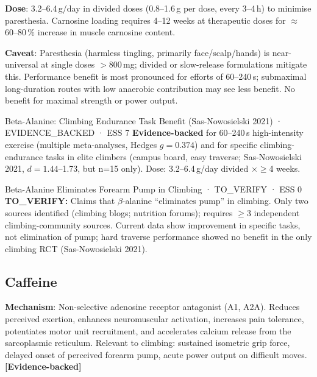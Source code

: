 \textbf{Dose}: 3.2--6.4\,g/day in divided doses (0.8--1.6\,g per dose, every 3--4\,h) to minimise paresthesia. Carnosine loading requires 4--12 weeks at therapeutic doses for ${\approx}$60--80\,\% increase in muscle carnosine content.

\textbf{Caveat}: Paresthesia (harmless tingling, primarily face/scalp/hands) is near-universal at single doses $>$800\,mg; divided or slow-release formulations mitigate this. Performance benefit is most pronounced for efforts of 60--240\,s; submaximal long-duration routes with low anaerobic contribution may see less benefit. No benefit for maximal strength or power output.

\begin{evidencebox}{Beta-Alanine: Climbing Endurance Task Benefit (Sas-Nowosielski 2021) · EVIDENCE\_BACKED · ESS 7}
\textbf{Evidence-backed} for 60--240\,s high-intensity exercise (multiple meta-analyses, Hedges $g = 0.374$) and for specific climbing-endurance tasks in elite climbers (campus board, easy traverse; Sas-Nowosielski 2021, $d = 1.44$--1.73, but n=15 only). Dose: 3.2--6.4\,g/day divided $\times \geq$4 weeks.
\end{evidencebox}

\begin{toverifybox}{Beta-Alanine Eliminates Forearm Pump in Climbing · TO\_VERIFY · ESS 0}
\textbf{TO\_VERIFY:} Claims that $\beta$-alanine ``eliminates pump'' in climbing. Only two sources identified (climbing blogs; nutrition forums); requires $\geq$3 independent climbing-community sources. Current data show improvement in specific tasks, not elimination of pump; hard traverse performance showed no benefit in the only climbing RCT (Sas-Nowosielski 2021).
\end{toverifybox}

\subsection{Caffeine}
\label{subsec:caffeine}

\textbf{Mechanism}: Non-selective adenosine receptor antagonist (A1, A2A). Reduces perceived exertion, enhances neuromuscular activation, increases pain tolerance, potentiates motor unit recruitment, and accelerates calcium release from the sarcoplasmic reticulum. Relevant to climbing: sustained isometric grip force, delayed onset of perceived forearm pump, acute power output on difficult moves. \textbf{[Evidence-backed]}

